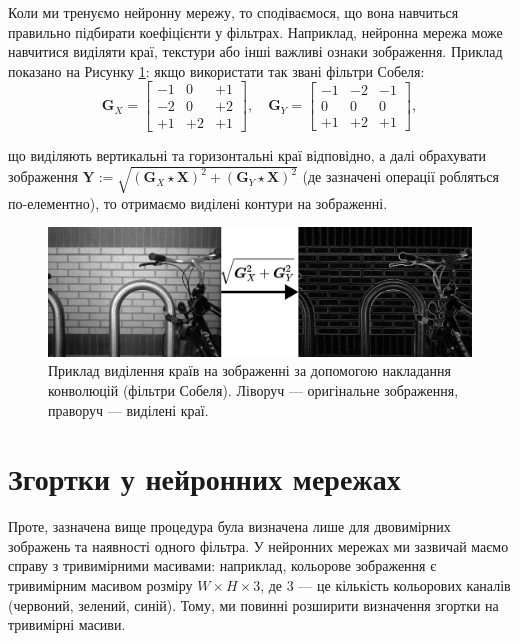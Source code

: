 Коли ми тренуємо нейронну мережу, то сподіваємося, що вона навчиться 
правильно підбирати коефіцієнти у фільтрах. Наприклад, нейронна мережа 
може навчитися виділяти краї, текстури або інші важливі ознаки зображення.
Приклад показано на Рисунку \ref{fig:sobel}: якщо використати 
так звані фільтри Собеля:
\begin{equation}
    \boldsymbol{G}_X = \begin{bmatrix}
        -1 & 0 & +1 \\
        -2 & 0 & +2 \\
        +1 & +2 & +1 
    \end{bmatrix}, \quad \boldsymbol{G}_Y = \begin{bmatrix}
        -1 & -2 & -1 \\
        0 & 0 & 0 \\
        +1 & +2 & +1
    \end{bmatrix},
\end{equation}

що виділяють вертикальні та горизонтальні краї відповідно, а далі обрахувати
зображення $\boldsymbol{Y} := \sqrt{(\boldsymbol{G}_X \star \boldsymbol{X})^2 +
(\boldsymbol{G}_Y \star \boldsymbol{X})^2}$ (де зазначені операції робляться
по-елементно), то отримаємо виділені контури на зображенні.

\begin{figure}
    \centering
    \includegraphics[width=1.0\linewidth]{figures/convolutions/sobel.pdf}
    \caption{Приклад виділення країв на зображенні за допомогою накладання
    конволюцій (фільтри Собеля). Ліворуч --- оригінальне зображення, праворуч
    --- виділені краї.}
    \label{fig:sobel}
\end{figure}

\section{Згортки у нейронних мережах}

Проте, зазначена вище процедура була визначена лише для двовимірних
зображень та наявності одного фільтра. У нейронних мережах ми
зазвичай маємо справу з тривимірними масивами: наприклад, кольорове 
зображення є тривимірним масивом розміру $W \times H \times 3$, де
$3$ --- це кількість кольорових каналів (червоний, зелений, синій).
Тому, ми повинні розширити визначення згортки на тривимірні масиви.

